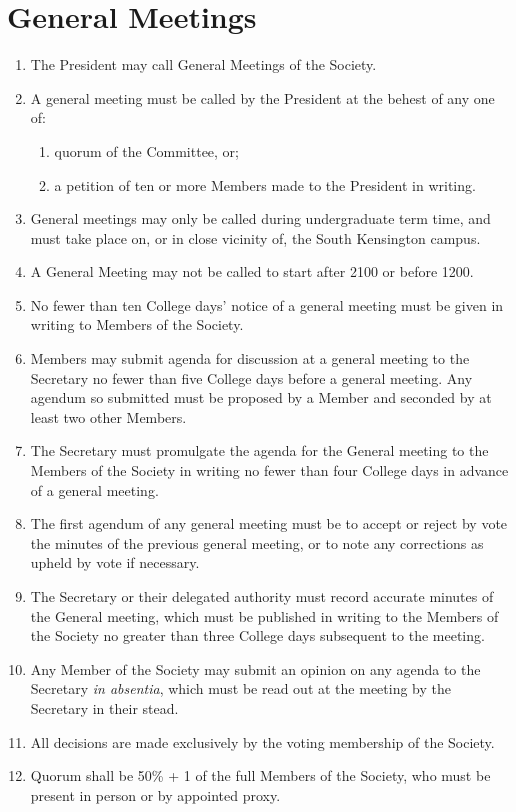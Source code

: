 \documentclass[a4paper]{tufte-handout}
\newcommand{\policyOffset}{12pt}
\newcommand{\policyCspp}[2][\policyOffset]{\marginnote[#1]{\textsc{CSP Policy \S#2}}}
\newcommand{\policyBye}[2][\policyOffset]{\marginnote[#1]{\textsc{Bye-laws \S#2}}}
\begin{document}
\section{General Meetings}
\begin{enumerate}[resume]
    \item The President may call General Meetings of the Society.
    \item \policyCspp{74} A general meeting must be called by the President at the behest of any one of:
        \begin{enumerate}           
            \item quorum of the Committee, or;
            \item a petition of ten or more Members made to the President in writing.
        \end{enumerate}
    \item General meetings may only be called during undergraduate term time, and must take place on, or in close vicinity of, the South Kensington campus.
    \item A General Meeting may not be called to start after 2100 or before 1200.
    \item No fewer than ten College days' notice of a general meeting must be given in writing to Members of the Society.
    \item Members may submit agenda for discussion at a general meeting to the Secretary no fewer than five College days before a general meeting. Any agendum so submitted must be proposed by a Member and seconded by at least two other Members.
    \item The Secretary must promulgate the agenda for the General meeting to the Members of the Society in writing no fewer than four College days in advance of a general meeting.
    \item The first agendum of any general meeting must be to accept or reject by vote the minutes of the previous general meeting, or to note any corrections as upheld by vote if necessary.
    \item The Secretary or their delegated authority must record accurate minutes of the General meeting, which must be published in writing to the Members of the Society no greater than three College days subsequent to the meeting.
    \item Any Member of the Society may submit an opinion on any agenda to the Secretary \textit{in absentia}, which must be read out at the meeting by the Secretary in their stead.
    \item All decisions are made exclusively by the voting membership of the Society.
    \item \policyBye{B11} Quorum shall be 50\% + 1 of the full Members of the Society, who must be present in person or by appointed proxy.
\end{enumerate}
\end{document}
